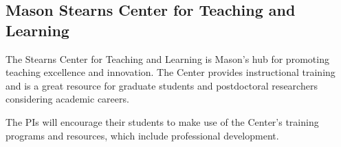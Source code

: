 \documentclass[11pt]{article}
\begin{document}
\subsection*{Mason Stearns Center for Teaching and Learning} The Stearns Center for Teaching and Learning is Mason’s hub for promoting teaching excellence and innovation. The Center provides instructional training and is a great resource for graduate students and postdoctoral researchers considering academic careers.

The PIs will encourage their students to make use of the Center's training programs and resources, which include professional development.
\end{document}
